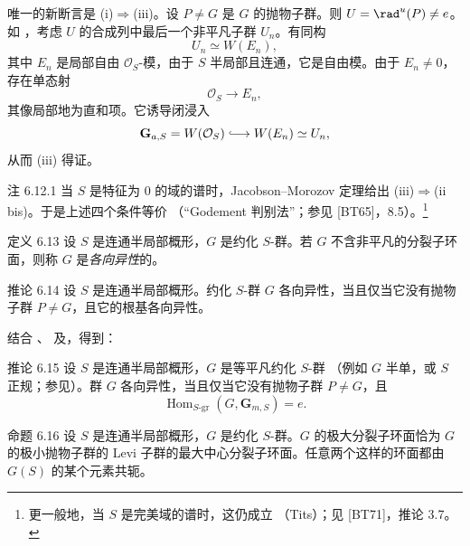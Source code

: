 唯一的新断言是 \textup{(i)}\(\Rightarrow\)\textup{(iii)}。设 \(P\ne G\) 是 \(G\) 的抛物子群。则 \(U=\rad^u(P)\ne e\)。如 ，考虑 \(U\) 的合成列中最后一个非平凡子群 \(U_n\)。有同构
\[
 U_n\simeq W(E_n),
\]
其中 \(E_n\) 是局部自由 \(\mathcal O_S\)-模，由于 \(S\) 半局部且连通，它是自由模。由于 \(E_n\ne0\)，存在单态射
\[
 \mathcal O_S\longrightarrow E_n,
\]
其像局部地为直和项。它诱导闭浸入
\[
 \mathbf G_{a,S}=W(\mathcal O_S)
   \lhook\joinrel\longrightarrow W(E_n)\simeq U_n,
\]
从而 \textup{(iii)} 得证。

\begin{sgastatement}{注 6.12.1}
当 \(S\) 是特征为 \(0\) 的域的谱时，Jacobson--Morozov 定理给出 \textup{(iii)}\(\Rightarrow\)\textup{(ii bis)}。于是上述四个条件等价 \textup{（“Godement 判别法”；参见 \textup{[BT65]}，8.5）}。\footnote{更一般地，当 \(S\) 是完美域的谱时，这仍成立 \textup{（Tits）}；见 \textup{[BT71]}，推论 3.7。}
\end{sgastatement}

\begin{sgastatement}{定义 6.13}
设 \(S\) 是连通半局部概形，\(G\) 是约化 \(S\)-群。若 \(G\) 不含非平凡的分裂子环面，则称 \(G\) 是\emph{各向异性}的。
\end{sgastatement}

\begin{sgastatement}{推论 6.14}
设 \(S\) 是连通半局部概形。约化 \(S\)-群 \(G\) 各向异性，当且仅当它没有抛物子群 \(P\ne G\)，且它的根基各向异性。
\end{sgastatement}

结合 、 及，得到：

\begin{sgastatement}{推论 6.15}
设 \(S\) 是连通半局部概形，\(G\) 是等平凡约化 \(S\)-群 \textup{（例如 \(G\) 半单，或 \(S\) 正规；参见）}。群 \(G\) 各向异性，当且仅当它没有抛物子群 \(P\ne G\)，且
\[
 \operatorname{Hom}_{S\text{-}\mathrm{gr}}
   (G,\mathbf G_{m,S})=e.
\]
\end{sgastatement}

\begin{sgastatement}{命题 6.16}
设 \(S\) 是连通半局部概形，\(G\) 是约化 \(S\)-群。\(G\) 的极大分裂子环面恰为 \(G\) 的极小抛物子群的 Levi 子群的最大中心分裂子环面。任意两个这样的环面都由 \(G(S)\) 的某个元素共轭。
\end{sgastatement}

